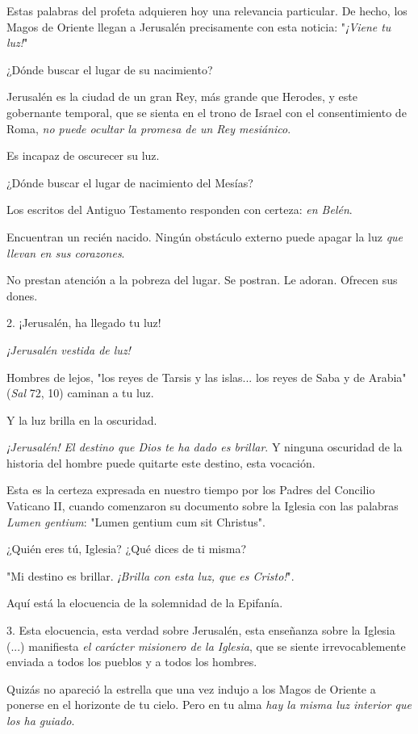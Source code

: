\begin{body}
Estas palabras del profeta adquieren hoy una relevancia particular. De hecho, los Magos de Oriente llegan a Jerusalén precisamente con esta noticia: "\emph{¡Viene tu luz!}"

¿Dónde buscar el lugar de su nacimiento?

Jerusalén es la ciudad de un gran Rey, más grande que Herodes, y este gobernante temporal, que se sienta en el trono de Israel con el consentimiento de Roma, \emph{no puede ocultar la promesa de un Rey mesiánico}.

Es incapaz de oscurecer su luz.

¿Dónde buscar el lugar de nacimiento del Mesías?

Los escritos del Antiguo Testamento responden con certeza: \emph{en Belén}.

Encuentran un recién nacido. Ningún obstáculo externo puede apagar la luz \emph{que llevan en sus corazones}.

No prestan atención a la pobreza del lugar. Se postran. Le adoran. Ofrecen sus dones.

2. ¡Jerusalén, ha llegado tu luz!

\emph{¡Jerusalén vestida de luz!}

Hombres de lejos, "los reyes de Tarsis y las islas... los reyes de Saba y de Arabia" (\emph{Sal} 72, 10) caminan a tu luz.

Y la luz brilla en la oscuridad.

\emph{¡Jerusalén! El destino que Dios te ha dado es brillar}. Y ninguna oscuridad de la historia del hombre puede quitarte este destino, esta vocación.

Esta es la certeza expresada en nuestro tiempo por los Padres del Concilio Vaticano II, cuando comenzaron su documento sobre la Iglesia con las palabras \emph{Lumen gentium}: "Lumen gentium cum sit Christus".

¿Quién eres tú, Iglesia? ¿Qué dices de ti misma?

"Mi destino es brillar. \emph{¡Brilla con esta luz, que es Cristo!}".

Aquí está la elocuencia de la solemnidad de la Epifanía.

3. Esta elocuencia, esta verdad sobre Jerusalén, esta enseñanza sobre la Iglesia (...) manifiesta \emph{el carácter misionero de la Iglesia}, que se siente irrevocablemente enviada a todos los pueblos y a todos los hombres.

Quizás no apareció la estrella que una vez indujo a los Magos de Oriente a ponerse en el horizonte de tu cielo. Pero en tu alma \emph{hay la misma luz interior que los ha guiado}.


\end{body}

